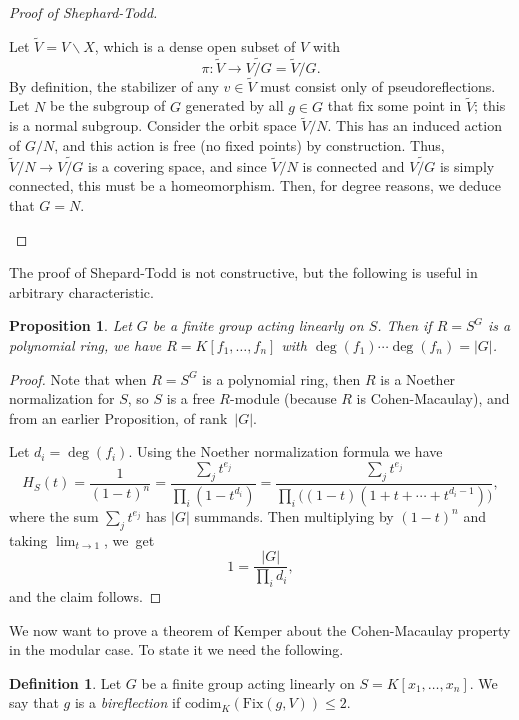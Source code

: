 \documentclass[12pt]{amsart}
\newtheorem{proposition}[theorem]{Proposition}
\theoremstyle{definition}
\newtheorem{definition}[theorem]{Definition}
\numberwithin{equation}{theorem}
\def\to{\longrightarrow}
\begin{document}
\begin{proof}[Proof of Shephard-Todd]
\begin{asparaenum}
Let $\widetilde{V} = V \smallsetminus X$, which is a dense open subset of $V$ with 
\[ \pi : \widetilde{V} \to \widetilde{V/G}=\widetilde{V}/G.\]
By definition, the stabilizer of any $v\in \widetilde{V}$ must consist only of pseudoreflections.
Let $N$ be the subgroup of $G$ generated by all $g\in G$ that fix some point in $\widetilde{V}$; this is a normal subgroup. Consider the orbit space $\widetilde{V}/N$. This has an induced action of $G/N$, and this action is free (no fixed points) by construction. Thus, $\widetilde{V}/N \to \widetilde{V/G}$ is a covering space, and since $\widetilde{V}/N$ is connected and $\widetilde{V/G}$ is simply connected, this must be a homeomorphism. Then, for degree reasons, we deduce that $G=N$.\qedhere
\end{asparaenum}
\end{proof}

The proof of Shepard-Todd is not constructive, but the following is useful in arbitrary characteristic.



\begin{proposition} Let $G$ be a finite group acting linearly on $S$. Then if $R=S^G$ is a polynomial ring, we have $R=K[f_1,\dots,f_n]$ with $\deg(f_1) \cdots \deg(f_n) = |G|$.
\end{proposition}
\begin{proof}
Note that when $R=S^G$ is a polynomial ring, then $R$ is a Noether normalization for $S$, so $S$ is a free $R$-module (because $R$ is Cohen-Macaulay), and from an earlier Proposition, of rank~$|G|$. 

Let $d_i =\deg(f_i)$. Using the Noether normalization formula we have
\[ H_S(t) = \frac{1}{(1-t)^n}  = \frac{\sum_j t^{e_j} }{\prod_i (1-t^{d_i})} = \frac{\sum_j t^{e_j} }{\prod_i \big((1-t)(1 + t + \cdots + t^{d_i-1})\big)},\]
where the sum $\sum_j t^{e_j}$ has $|G|$ summands. Then multiplying by $(1-t)^n$ and taking $\lim_{t \to 1}$, we~get
\[ 1 = \frac{|G|}{\prod_i d_i},\]
and the claim follows.
\end{proof}


We now want to prove a theorem of Kemper about the Cohen-Macaulay property in the modular case.  To state it we need the following.

\begin{definition}
Let $G$ be a finite group acting linearly on $S=K[x_1,\dots,x_n]$. We say that $g$ is a \emph{bireflection} if $\mathrm{codim}_K( \mathrm{Fix}(g,V) ) \leq 2$.
\end{definition}
\end{document}
